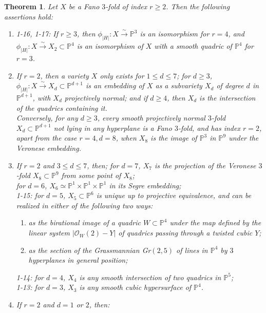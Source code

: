 \documentclass[11pt]{amsart}
\theoremstyle{plain}
\newtheorem{theorem}{Theorem}[section]
\theoremstyle{definition}
\theoremstyle{expl}
\begin{document}
\begin{theorem}
    Let $X$ be a Fano $3$-fold of index $r\geq 2$. Then the following assertions hold:
    \begin{enumerate}
        \item[(i)]1-16, 1-17: If $r\geq 3$, then $\phi_{|H|}: X \xrightarrow{\sim} \mathbb{P}^3$ is an isomorphism for $r=4$, and $\phi_{|H|}: X \xrightarrow{\sim} X_2\subset \mathbb{P}^4$ is an isomorphism of $X$ with a smooth quadric of $\mathbb{P}^4$ for $r=3$.
        \item[(ii)] If $r=2$, then a variety $X$ only exists for $1\leq d \leq 7$; for $d\geq 3$, $\phi_{|H|}: X \xrightarrow{\sim}X_d \subset \mathbb{P}^{d+1}$ is an embedding of $X$ as a subvariety $X_d$ of degree $d$ in $\mathbb{P}^{d+1}$, with $X_d$ projectively normal; and if $d\geq 4$, then $X_d$ is the intersection of the quadrics containing it. \\
        Conversely, for any $d\geq 3$, every smooth projectively normal $3$-fold $X_d \subset \mathbb{P}^{d+1}$ not lying in any hyperplane is a Fano $3$-fold, and has index $r=2$, apart from the case $r=4, d=8$, when $X_8$ is the image of $\mathbb{P}^3$ in $\mathbb{P}^9$ under the Veronese embedding.
        \item[(iii)] If $r=2$ and $3\leq d \leq 7$, then; for $d=7$, $X_7$ is the projection of the Veronese $3$-fold $X_8 \subset \mathbb{P}^9$ from some point of $X_8$; \\
        for $d=6$, $X_6 \simeq \mathbb{P}^1 \times \mathbb{P}^1\times \mathbb{P}^1$ in its Segre embedding;\\
        1-15: for $d=5$, $X_5 \subset \mathbb{P}^6$ is unique up to projective equivalence, and can be realized in either of the following two ways:
        \begin{enumerate}
            \item[(a)] as the birational image of a quadric $W \subset \mathbb{P}^4$ under the map defined by the linear system $|\mathcal{O}_W(2)-Y|$ of quadrics passing through a twisted cubic $Y$;
            \item[(b)] as the section of the Grassmannian Gr$(2,5)$ of lines in $\mathbb{P}^4$ by $3$ hyperplanes in general position;
        \end{enumerate}
        1-14: for $d=4$, $X_4$ is any smooth intersection of two quadrics in $\mathbb{P}^5$;\\
        1-13: for $d=3$, $X_3$ is any smooth cubic hypersurface of $\mathbb{P}^4$. 
        \item[(iv)] If $r=2$ and $d=1$ or $2$, then:\\

\end{enumerate}
\end{theorem}
\end{document}
